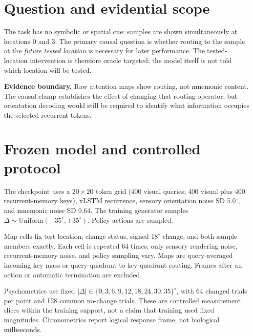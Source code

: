 \documentclass[10pt]{article}
\newcommand{\boundary}[1]{\par\smallskip\colorbox{Light}{\parbox{0.96\linewidth}{\textbf{Evidence boundary.} #1}}\par\smallskip}
\begin{document}
\section{Question and evidential scope}
The task has no symbolic or spatial cue: samples are shown simultaneously at locations 0 and 3. The primary causal question is whether routing to the sample at the \emph{future tested location} is necessary for later performance. The tested-location intervention is therefore oracle targeted; the model itself is not told which location will be tested.

\boundary{Raw attention maps show routing, not mnemonic content. The causal clamp establishes the effect of changing that routing operator, but orientation decoding would still be required to identify what information occupies the selected recurrent tokens.}

\section{Frozen model and controlled protocol}
The checkpoint uses a $20\times20$ token grid (400 visual queries; 400 visual plus 400 recurrent-memory keys), xLSTM recurrence, sensory orientation noise SD 5.0$^\circ$, and mnemonic noise SD 0.64. The training generator samples $\Delta\sim\mathrm{Uniform}(-35^\circ,+35^\circ)$. Policy actions are sampled.

Map cells fix test location, change status, signed $18^\circ$ change, and both sample members exactly. Each cell is repeated 64 times; only sensory rendering noise, recurrent-memory noise, and policy sampling vary. Maps are query-averaged incoming key mass or query-quadrant-to-key-quadrant routing. Frames after an action or automatic termination are excluded.

Psychometrics use fixed $|\Delta|\in\{0, 3, 6, 9, 12, 18, 24, 30, 35\}^\circ$, with 64 changed trials per point and 128 common no-change trials. These are controlled measurement slices within the training support, not a claim that training used fixed magnitudes. Chronometrics report logical response frame, not biological milliseconds.
\end{document}
